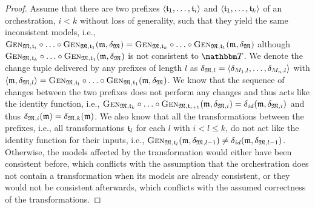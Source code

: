 \begin{proof}
    Assume that there are two prefixes $\langle \mathfrak{t}_{1}, \dots, \mathfrak{t}_{i} \rangle$ and $\langle \mathfrak{t}_{1}, \dots, \mathfrak{t}_{k} \rangle$ of an orchestration, $i < k$ without loss of generality, such that they yield the same inconsistent models, i.e., $\generalizationfunction{\metamodeltuple{M}, \transformation{t}_{i}} \concatfunction \dots \concatfunction \generalizationfunction{\metamodeltuple{M}, \transformation{t}_{1}}(\modeltuple{m}, \changetuple{\metamodeltuple{M}}) = \generalizationfunction{\metamodeltuple{M}, \transformation{t}_{k}} \concatfunction \dots \concatfunction \generalizationfunction{\metamodeltuple{M}, \transformation{t}_{1}}(\modeltuple{m}, \changetuple{\metamodeltuple{M}})$ although $\generalizationfunction{\metamodeltuple{M}, \transformation{t}_{k}} \concatfunction \dots \concatfunction \generalizationfunction{\metamodeltuple{M}, \transformation{t}_{1}}(\modeltuple{m}, \changetuple{\metamodeltuple{M}})$ is not consistent to $\transformationset{T}$.
    We denote the change tuple delivered by any prefixes of length $l$ as $\mathfrak{\delta}_{\mathfrak{M},l} = \langle \delta_{M_{1},l}, \dots, \delta_{M_{n}, l} \rangle$ with $\tupled{\modeltuple{m}, \changetuple{\metamodeltuple{M},l}} = \generalizationfunction{\metamodeltuple{M}, \transformation{t}_{l}} \concatfunction \dots \concatfunction \generalizationfunction{\metamodeltuple{M}, \transformation{t}_{1}}(\modeltuple{m}, \changetuple{\metamodeltuple{M}})$.
    We know that the sequence of changes between the two prefixes does not perform any changes and thus acts like the identity function, i.e., $\generalizationfunction{\metamodeltuple{M}, \transformation{t}_{k}} \concatfunction \dots \concatfunction \generalizationfunction{\metamodeltuple{M}, \transformation{t}_{i+1}}(\modeltuple{m}, \changetuple{\metamodeltuple{M},i}) = \identitychange(\modeltuple{m}, \changetuple{\metamodeltuple{M},i})$
    and thus $\mathfrak{\delta}_{\mathfrak{M},i}(\mathfrak{m}) = \mathfrak{\delta}_{\mathfrak{M},k}(\mathfrak{m})$.
    We also know that all the transformations between the prefixes, i.e., all transformations $\mathfrak{t}_{l}$ for each $l$ with $i < l \leq k$, do not act like the identity function for their inputs, i.e., $\textsc{Gen}_{\mathfrak{M}, \mathfrak{t}_{l}}(\mathfrak{m}, \mathfrak{\delta}_{\mathfrak{M},l-1}) \neq \delta_{\mathit{id}}(\mathfrak{m}, \mathfrak{\delta}_{\mathfrak{M},l-1})$.
    Otherwise, the models affected by the transformation would either have been consistent before, which conflicts with the assumption that the orchestration does not contain a transformation when its models are already consistent, or they would not be consistent afterwards, which conflicts with the assumed correctness of the transformations.


\end{proof}
